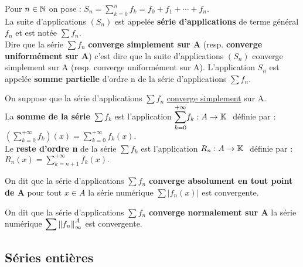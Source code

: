 \newpage

Pour \(n\in \mathbb{N}\) on pose : \(\displaystyle S_n = \sum_{k=0}^{n}f_k=f_0+f_1+\cdots+f_n \).\\
La suite d'applications \(\left(S_n\right)\) est appelée \textbf{série d'applications} de terme général \(f_n\) et est notée \(\sum f_n\).\\
Dire que la série \(\sum f_n\) \textbf{converge simplement sur A} (resp. \textbf{converge uniformément sur A}) c'est dire que la suite d'applications \(\left(S_n\right)\) converge simplement sur A (resp. converge uniformément sur A). L'application \(S_n\) est appelée \textbf{somme partielle} d'ordre n de la série d'applications \(\sum f_n\).

\vspace{1.2cm}

On suppose que la série d'applications \(\sum f_n\) \underline{converge simplement} sur A.\vspace{0.1cm}\\
La \textbf{somme de la série} \(\sum f_k\) est l'application \(\displaystyle \sum_{k=0}^{+\infty}\! f_k : A\to \mathbb{K} \ \) définie par : \(\displaystyle \left(\sum_{k=0}^{+\infty}f_k \right)(x)=\sum_{k=0}^{+\infty}f_k(x). \)\vspace{0.2cm}\\
Le \textbf{reste d'ordre n} de la série \(\sum f_k\) est l'application \(R_n : A\to \mathbb{K} \ \) définie par : \(\displaystyle R_n(x) = \sum_{k=n+1}^{+\infty}f_k(x). \)

\vspace{1cm}
On dit que la série d'applications \(\sum f_n\) \textbf{converge absolument en tout point de A} \ssi pour tout \( x\in A\) la série numérique \(\displaystyle \sum |f_n(x)|\) est convergente.

\vspace{1.3cm}

On dit que la série d'applications \(\sum f_n\) \textbf{converge normalement sur A} \ssi la série numérique \(\displaystyle \sum \left\lVert f_n\right\rVert_\infty^A\) est convergente.

\vspace{1.5cm}

\subsection{Séries entières}

